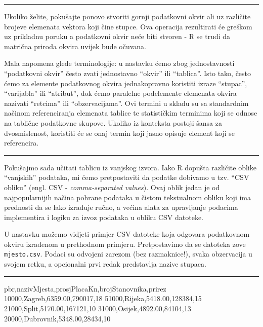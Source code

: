 \documentclass[]{book}
\newenvironment{Shaded}{\begin{snugshade}}{\end{snugshade}}
\newcommand{\DecValTok}[1]{\textcolor[rgb]{0.00,0.00,0.81}{#1}}
\newcommand{\FloatTok}[1]{\textcolor[rgb]{0.00,0.00,0.81}{#1}}
\newcommand{\NormalTok}[1]{#1}
\theoremstyle{definition}
\theoremstyle{definition}
\theoremstyle{definition}
\theoremstyle{remark}
\begin{document}
\begin{center}\rule{0.5\linewidth}{\linethickness}\end{center}

Ukoliko želite, pokušajte ponovo stvoriti gornji podatkovni okvir ali uz
različite brojeve elemenata vektora koji čine stupce. Ova operacija
rezultirati će greškom uz prikladnu poruku a podatkovni okvir neće biti
stvoren - R se trudi da matrična priroda okvira uvijek bude očuvana.

Mala napomena glede terminologije: u nastavku ćemo zbog jednostavnosti
``podatkovni okvir'' često zvati jednostavno ``okvir'' ili ``tablica''.
Isto tako, često ćemo za elemente podatkovnog okvira jednakopravno
koristiti izraze ``stupac'', ``varijabla'' ili ``atribut'', dok ćemo
paralelne podelemente elemenata okvira nazivati ``retcima'' ili
``obzervacijama''. Ovi termini u skladu su sa standardnim načinom
referenciranja elemenata tablice te statističkim terminima koji se
odnose na tablične podatkovne skupove. Ukoliko iz konteksta postoji
šansa za dvosmislenost, koristiti će se onaj termin koji jasno opisuje
element koji se referencira.

\begin{center}\rule{0.5\linewidth}{\linethickness}\end{center}

Pokušajmo sada učitati tablicu iz vanjskog izvora. Iako R dopušta
različite oblike ``vanjskih'' podataka, mi ćemo pretpostaviti da podatke
dobivamo u tzv. ``CSV obliku'' (engl. CSV - \emph{comma-separated
values}). Ovaj oblik jedan je od najpopularnijih načina pohrane podataka
u čistom tekstualnom obliku koji ima prednosti da se lako izrađuje
ručno, a većina alata za upravljanje podacima implementira i logiku za
izvoz podataka u obliku CSV datoteke.

U nastavku možemo vidjeti primjer CSV datoteke koja odgovara podatkovnom
okviru izrađenom u prethodnom primjeru. Pretpostavimo da se datoteka
zove \texttt{mjesto.csv}. Podaci su odvojeni zarezom (bez razmaknice!),
svaka obzervacija u svojem retku, a opcionalni prvi redak predstavlja
nazive stupaca.

\begin{center}\rule{0.5\linewidth}{\linethickness}\end{center}

\begin{Shaded}
\begin{Highlighting}[]
\NormalTok{pbr,nazivMjesta,prosjPlacaKn,brojStanovnika,prirez}
\DecValTok{10000}\NormalTok{,Zagreb,}\FloatTok{6359.00}\NormalTok{,}\DecValTok{790017}\NormalTok{,}\DecValTok{18} 
\DecValTok{51000}\NormalTok{,Rijeka,}\FloatTok{5418.00}\NormalTok{,}\DecValTok{128384}\NormalTok{,}\DecValTok{15}
\DecValTok{21000}\NormalTok{,Split,}\FloatTok{5170.00}\NormalTok{,}\DecValTok{167121}\NormalTok{,}\DecValTok{10}
\DecValTok{31000}\NormalTok{,Osijek,}\FloatTok{4892.00}\NormalTok{,}\DecValTok{84104}\NormalTok{,}\DecValTok{13} 
\DecValTok{20000}\NormalTok{,Dubrovnik,}\FloatTok{5348.00}\NormalTok{,}\DecValTok{28434}\NormalTok{,}\DecValTok{10}
\end{Highlighting}
\end{Shaded}
\end{document}
